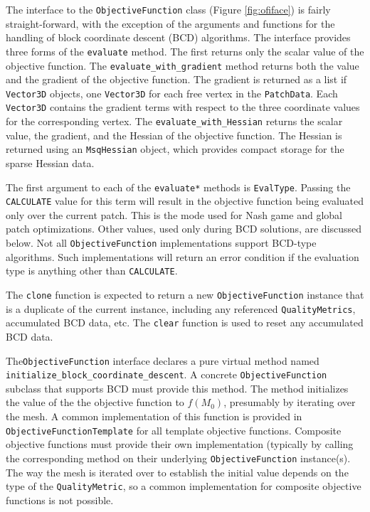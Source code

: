 \documentclass{article}
\begin{document}
The interface to the \texttt{ObjectiveFunction} class (Figure \ref{fig:ofiface}) is fairly straight-forward, with the exception of the arguments and functions for the handling of block coordinate descent (BCD) algorithms.  The interface provides three forms of the \texttt{evaluate} method.  The first returns only the scalar value of the objective function.  The \texttt{evaluate\_with\_gradient} method returns both the value and the gradient of the objective function.  The gradient is returned as a list if \texttt{Vector3D} objects, one \texttt{Vector3D} for each free vertex in the \texttt{PatchData}.   Each \texttt{Vector3D} contains the gradient terms with respect to the three coordinate values for the corresponding vertex.  The \texttt{evaluate\_with\_Hessian} returns the scalar value, the gradient, and the Hessian of the objective function.  The Hessian is returned using an \texttt{MsqHessian} object, which provides compact storage for the sparse Hessian data.

The first argument to each of the \texttt{evaluate*} methods is \texttt{EvalType}.  Passing the \texttt{CALCULATE} value for this term will result in the objective function being evaluated only over the current patch.  This is the mode used for Nash game and global patch optimizations.  Other values, used only during BCD solutions, are discussed below.  Not all \texttt{ObjectiveFunction} implementations support BCD-type algorithms.  Such implementations will return an error condition if the evaluation type is anything other than \texttt{CALCULATE}.

The \texttt{clone} function is expected to return a new \texttt{ObjectiveFunction} instance that is a duplicate of the current instance, including any referenced \texttt{QualityMetrics}, accumulated BCD data, etc.  The \texttt{clear} function is used to reset any accumulated BCD data.  

The\texttt{ObjectiveFunction} interface declares a pure virtual method named \texttt{initialize\_block\_coordinate\_descent}.  A concrete \texttt{ObjectiveFunction} subclass that supports BCD must provide this method.  The method initializes the value of the the objective function to $f(M_0)$, presumably by iterating over the mesh.   A common implementation of this function is provided in \texttt{ObjectiveFunctionTemplate} for all template objective functions.  Composite objective functions must provide their own implementation (typically by calling the corresponding method on their underlying \texttt{ObjectiveFunction} instance(s).  The way the mesh is iterated over to establish the initial value depends on the type of the \texttt{QualityMetric}, so a common implementation for composite objective functions is not possible.  
\end{document}
